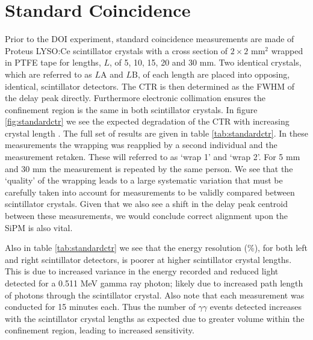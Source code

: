 \section{Standard Coincidence}
\label{sec:standardctr}
Prior to the DOI experiment, standard coincidence measurements are made of Proteus LYSO:Ce scintillator crystals with a cross section of $2\times2$ mm$^2$ wrapped in PTFE tape for lengths, $L$, of 5, 10, 15, 20 and 30 mm. Two identical crystals, which are referred to as $L\text{A}$ and $L\text{B}$, of each length are placed into opposing, identical, scintillator detectors. The CTR is then determined as the FWHM of the delay peak directly. Furthermore electronic collimation ensures the confinement region is the same in both scintillator crystals. In figure \ref{fig:standardctr} we see the expected degradation of the CTR with increasing crystal length \cite{r_Paganoni_Pauwels_et_al__2011}\cite{Wiener_Kaul_Surti_Karp_2010}\cite{Choong_2009}\cite{Gola_Piemonte_Tarolli_2013}\cite{o_Pro_Serra_Tarolli_Zorzi_2011}. The full set of results are given in table \ref{tab:standardctr}. In these measurements the wrapping was reapplied by a second individual and the measurement retaken. These will referred to as `wrap 1' and `wrap 2'. For 5 mm and 30 mm the measurement is repeated by the same person. We see that the `quality' of the wrapping leads to a large systematic variation that must be carefully taken into account for measurements to be validly compared between scintillator crystals. Given that we also see a shift in the delay peak centroid between these measurements, we would conclude correct alignment upon the SiPM is also vital. 

Also in table \ref{tab:standardctr} we see that the energy resolution (\%), for both left and right scintillator detectors, is poorer at higher scintillator crystal lengths. This is due to increased variance in the energy recorded and reduced light detected for a 0.511 MeV gamma ray photon; likely due to increased path length of photons through the scintillator crystal. Also note that each measurement was conducted for 15 minutes each. Thus the number of $\gamma\gamma$ events detected increases with the scintillator crystal lengths as expected  due to greater volume within the confinement region, leading to increased sensitivity.
